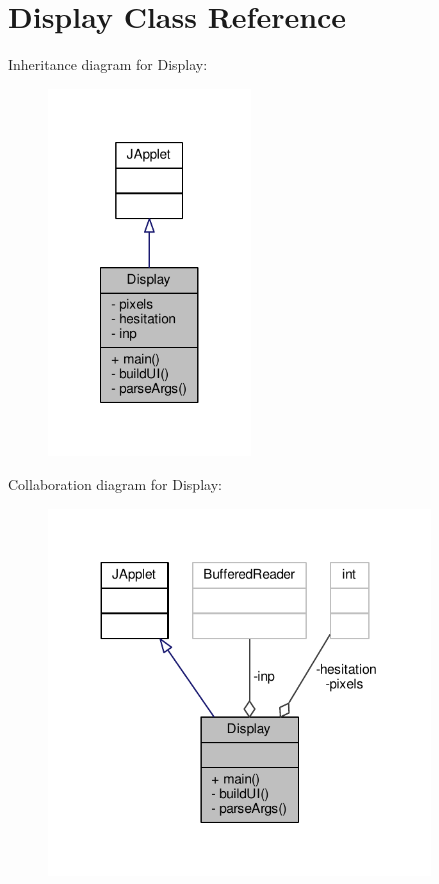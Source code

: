\hypertarget{classDisplay}{\section{Display Class Reference}
\label{classDisplay}
}


Inheritance diagram for Display\-:
\nopagebreak
\begin{figure}[H]
\begin{center}
\leavevmode
\includegraphics[width=152pt]{classDisplay__inherit__graph}
\end{center}
\end{figure}


Collaboration diagram for Display\-:
\nopagebreak
\begin{figure}[H]
\begin{center}
\leavevmode
\includegraphics[width=287pt]{classDisplay__coll__graph}
\end{center}
\end{figure}
